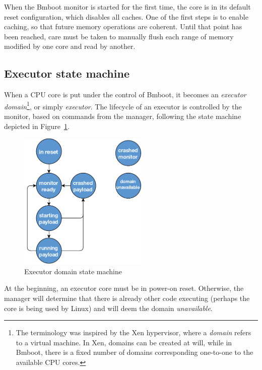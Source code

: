 When the Bmboot monitor is started for the first time, the core is in its default reset configuration, which disables all caches. One of the first steps is to enable caching, so that future memory operations are coherent. Until that point has been reached, care must be taken to manually flush each range of memory modified by one core and read by another.

\subsection{Executor state machine \label{subsec:executor-fsm}}

When a CPU core is put under the control of Bmboot, it becomes an \textit{executor domain}\footnote{The terminology was inspired by the Xen hypervisor, where a \textit{domain} refers to a virtual machine. In Xen, domains can be created at will, while in Bmboot, there is a fixed number of domains corresponding one-to-one to the available CPU cores.}, or simply \textit{executor}. The lifecycle of an executor is controlled by the monitor, based on commands from the manager, following the state machine depicted in Figure~\ref{fig:state-machine}.

\begin{figure}[h]
  \centering
  \includegraphics[width=0.55\textwidth]{images/executor-fsm.pdf}
  \caption{Executor domain state machine \label{fig:state-machine}}
\end{figure}

At the beginning, an executor core must be in power-on reset. Otherwise, the manager will determine that there is already other code executing (perhaps the core is being used by Linux) and will deem the domain \textit{unavailable}.

